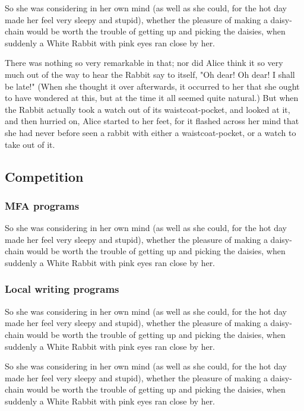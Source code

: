 \documentclass[12pt]{article}
\begin{document}
So she was considering in her own mind (as well as she could, for the hot day made her feel very sleepy and stupid), whether the pleasure of making a daisy-chain would be worth the trouble of getting up and picking the daisies, when suddenly a White Rabbit with pink eyes ran close by her.

There was nothing so very remarkable in that; nor did Alice think it so very much out of the way to hear the Rabbit say to itself, "Oh dear! Oh dear! I shall be late!" (When she thought it over afterwards, it occurred to her that she ought to have wondered at this, but at the time it all seemed quite natural.) But when the Rabbit actually took a watch out of its waistcoat-pocket, and looked at it, and then hurried on, Alice started to her feet, for it flashed across her mind that she had never before seen a rabbit with either a waistcoat-pocket, or a watch to take out of it. 

\subsection{Competition}
\label{sec:orgheadline19}

\subsubsection{MFA programs}
\label{sec:orgheadline14}
So she was considering in her own mind (as well as she could, for the hot day made her feel very sleepy and stupid), whether the pleasure of making a daisy-chain would be worth the trouble of getting up and picking the daisies, when suddenly a White Rabbit with pink eyes ran close by her. 

\subsubsection{Local writing programs}
\label{sec:orgheadline15}
So she was considering in her own mind (as well as she could, for the hot day made her feel very sleepy and stupid), whether the pleasure of making a daisy-chain would be worth the trouble of getting up and picking the daisies, when suddenly a White Rabbit with pink eyes ran close by her. 

So she was considering in her own mind (as well as she could, for the hot day made her feel very sleepy and stupid), whether the pleasure of making a daisy-chain would be worth the trouble of getting up and picking the daisies, when suddenly a White Rabbit with pink eyes ran close by her. 
\end{document}

